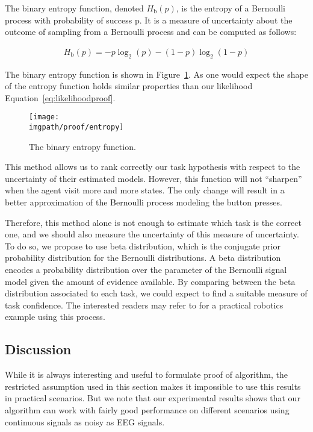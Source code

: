 The binary entropy function, denoted $H_{\mathrm b}(p)$, is the entropy of a Bernoulli process with probability of success p. It is a measure of uncertainty about the outcome of sampling from a Bernoulli process and can be computed as follows:

\begin{eqnarray}
H_{\mathrm b}(p) = -p\log_2(p) - (1-p)\log_2(1-p) 
\label{eq:likelihoodentropy}
\end{eqnarray}

The binary entropy function is shown in Figure~\ref{fig:prooflikelihoodentropy}. As one would expect the shape of the entropy function holds similar properties than our likelihood Equation~\ref{eq:likelihoodproof}.
    
\begin{figure}[!htbp]
\centering
\texttt{[image: \\imgpath/proof/entropy]}
\caption{The binary entropy function.}
\label{fig:prooflikelihoodentropy}
\end{figure}

This method allows us to rank correctly our task hypothesis with respect to the uncertainty of their estimated models. However, this function will not ``sharpen'' when the agent visit more and more states. The only change will result in a better approximation of the Bernoulli process modeling the button presses.

Therefore, this method alone is not enough to estimate which task is the correct one, and we should also measure the uncertainty of this measure of uncertainty. To do so, we propose to use beta distribution, which is the conjugate prior probability distribution for the Bernoulli distributions. A beta distribution encodes a probability distribution over the parameter of the Bernoulli signal model given the amount of evidence available. By comparing between the beta distribution associated to each task, we could expect to find a suitable measure of task confidence. The interested readers may refer to \cite{montesano2012active} for a practical robotics example using this process.

\subsection{Discussion}

While it is always interesting and useful to formulate proof of algorithm, the restricted assumption used in this section makes it impossible to use this results in practical scenarios. But we note that our experimental results shows that our algorithm can work with fairly good performance on different scenarios using continuous signals as noisy as EEG signals.

